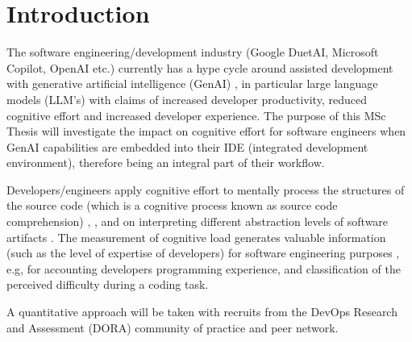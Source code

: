 \documentclass[jou, 12pt]{apa7}
\begin{document}
\maketitle
\onecolumn

\section{Introduction}

The software engineering/development industry (Google DuetAI, Microsoft Copilot, OpenAI etc.) currently has a hype cycle around assisted development with generative artificial intelligence (GenAI) \parencite{Nguyen-Duc2023GenerativeAgenda}, in particular large language models (LLM’s) with claims of increased developer productivity, reduced cognitive effort and increased developer experience. The purpose of this MSc Thesis will investigate the impact on cognitive effort for software engineers when GenAI capabilities are embedded into their IDE (integrated development environment), therefore being an integral part of their workflow.

Developers/engineers apply cognitive effort to mentally process the structures of the source code (which is a cognitive process known as source code comprehension) \parencite{Crk2016AssessingComprehension, Crk2015UnderstandingExpertise}, , and on interpreting different abstraction levels of software artifacts \parencite{Minas2017NeurophysiologicalDevelopers}. The measurement of cognitive load generates valuable information (such as the level of expertise of developers) for software engineering purposes \parencite{Crk2016AssessingComprehension,], Crk2015UnderstandingExpertise}, e.g, for accounting developers programming experience, and classification of the perceived difficulty \parencite{Fritz2014UsingDevelopment, Fritz2016LeveragingProductivity} during a coding task.

A quantitative approach will be taken with recruits from the DevOps Research and Assessment (DORA) \parencite{Humble2018Accelerate:Organizations} community of practice \parencite{DORACommunity} and peer network.
\end{document}
